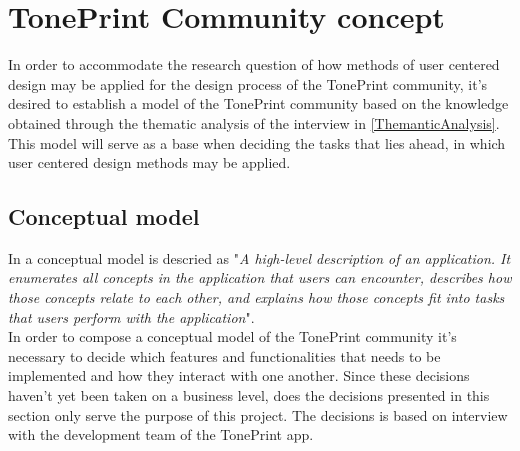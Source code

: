 \chapter{TonePrint Community concept}
\label{CommunityConcept}
In order to accommodate the research question of how methods of user centered design may be applied for the design process of the TonePrint community, it's desired to establish a model of the TonePrint community based on the knowledge obtained through the thematic analysis of the interview in \autoref{ThemanticAnalysis}. This model will serve as a base when deciding the tasks that lies ahead, in which user centered design methods may be applied.

\section{Conceptual model}
\label{ConceptualModel}
In \parencite[17]{PDF:Henderson2012} a conceptual model is descried  as "\textit{A high-level description of an application. It enumerates all concepts in the application that users can encounter, describes how those concepts relate to each other, and explains how those concepts fit into tasks that users perform with the application}".\\
In order to compose a conceptual model of the TonePrint community it's necessary to decide which features and functionalities that needs to be implemented and how they interact with one another. Since these decisions haven't yet been taken on a business level, does the decisions presented in this section only serve the purpose of this project. The decisions is based on interview with the development team of the TonePrint app.

